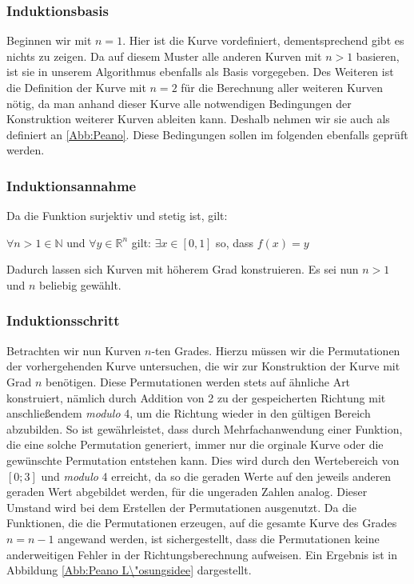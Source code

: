 \documentclass[course=asp]{aspdoc}
\begin{document}
\subsubsection{Induktionsbasis} \label{Induktionsbasis}
Beginnen wir mit $n = 1$. Hier ist die Kurve vordefiniert, dementsprechend gibt es nichts zu zeigen. Da auf diesem Muster alle anderen Kurven mit $n > 1$ basieren, ist sie in unserem Algorithmus ebenfalls als Basis vorgegeben.
Des Weiteren ist die Definition der Kurve mit $n = 2$ f\"ur die Berechnung aller weiteren Kurven n\"otig, da man anhand dieser Kurve alle notwendigen Bedingungen der Konstruktion weiterer Kurven ableiten kann. Deshalb nehmen wir sie auch als definiert an \ref{Abb:Peano}. Diese Bedingungen sollen im folgenden ebenfalls gepr\"uft werden.

\subsubsection{Induktionsannahme} \label{Induktionsannahme}
Da die Funktion surjektiv und stetig ist, gilt:

\begin{center}
$\forall n > 1 \in \mathbb{N}$ und $\forall y \in \mathbb{R}^n$ gilt: $\exists x \in [0,1]$ so, dass $f(x)= y$
\end{center}

Dadurch lassen sich Kurven mit h\"oherem Grad konstruieren. Es sei nun $n > 1$ und $n$ beliebig gew\"ahlt.

\subsubsection{Induktionsschritt} \label{Induktionsschritt}
Betrachten wir nun Kurven $n$-ten Grades. Hierzu m\"ussen wir die Permutationen der vorhergehenden Kurve untersuchen, die wir zur Konstruktion der Kurve mit Grad $n$ ben\"otigen.
Diese Permutationen werden stets auf \"ahnliche Art konstruiert, n\"amlich durch Addition von 2 zu der gespeicherten Richtung mit anschlie\ss endem \textit{modulo} 4, um die Richtung wieder in den g\"ultigen Bereich abzubilden. So ist gew\"ahrleistet, dass durch Mehrfachanwendung einer Funktion, die eine solche Permutation generiert, immer nur die orginale Kurve oder die gew\"unschte Permutation entstehen kann. Dies wird durch den Wertebereich von $[0;3]$ und \textit{modulo} 4 erreicht, da so die geraden Werte auf den jeweils anderen geraden Wert abgebildet werden, f\"ur die ungeraden Zahlen analog. Dieser Umstand wird bei dem Erstellen der Permutationen ausgenutzt.
Da die Funktionen, die die Permutationen erzeugen, auf die gesamte Kurve des Grades $n = n - 1$ angewand werden, ist sichergestellt, dass die Permutationen keine anderweitigen Fehler in der Richtungsberechnung aufweisen. Ein Ergebnis ist in Abbildung \ref{Abb:Peano L\"osungsidee} dargestellt.
\end{document}
